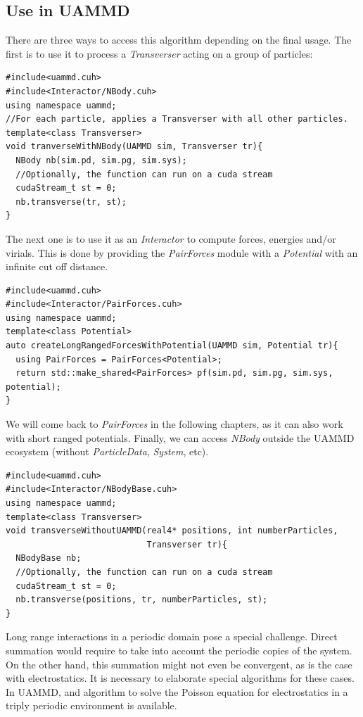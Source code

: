 \documentclass[ twoside,openright,titlepage,numbers=noenddot,%
headinclude,footinclude,cleardoublepage=empty,abstract=on,
BCOR=5mm,paper=a4,fontsize=11pt, dvipsnames
]{scrreprt}
\def\ucpp{uammd_cpp_lexer.py:UAMMDCppLexer -x}
\newcommand{\uammd}{\gls{UAMMD}\xspace}
\begin{document}
\subsection*{Use in UAMMD}
There are three ways to access this algorithm depending on the final usage.
The first is to use it to process a \emph{Transverser} acting on a group of particles:
\begin{verbatim}
#include<uammd.cuh>
#include<Interactor/NBody.cuh>
using namespace uammd;
//For each particle, applies a Transverser with all other particles.
template<class Transverser>
void tranverseWithNBody(UAMMD sim, Transverser tr){
  NBody nb(sim.pd, sim.pg, sim.sys);
  //Optionally, the function can run on a cuda stream
  cudaStream_t st = 0;
  nb.transverse(tr, st);
}
\end{verbatim}
The next one is to use it as an \emph{Interactor} to compute forces, energies and/or virials. This is done by providing the \emph{PairForces} module with a \emph{Potential} with an infinite cut off distance.
\begin{verbatim}
#include<uammd.cuh>
#include<Interactor/PairForces.cuh>
using namespace uammd;
template<class Potential>
auto createLongRangedForcesWithPotential(UAMMD sim, Potential tr){
  using PairForces = PairForces<Potential>;
  return std::make_shared<PairForces> pf(sim.pd, sim.pg, sim.sys, potential);
}
\end{verbatim}
We will come back to \emph{PairForces} in the following chapters, as it can also work with short ranged potentials.
Finally, we can access \emph{NBody} outside the \uammd ecosystem (without \emph{ParticleData}, \emph{System}, etc).
\begin{verbatim}
#include<uammd.cuh>
#include<Interactor/NBodyBase.cuh>
using namespace uammd;
template<class Transverser>
void transverseWithoutUAMMD(real4* positions, int numberParticles,
                            Transverser tr){
  NBodyBase nb;
  //Optionally, the function can run on a cuda stream
  cudaStream_t st = 0;
  nb.transverse(positions, tr, numberParticles, st);
}
\end{verbatim}


Long range interactions in a periodic domain pose a special challenge. Direct summation would require to take into account the periodic copies of the system. On the other hand, this summation might not even be convergent, as is the case with electrostatics. It is necessary to elaborate special algorithms for these cases. In \uammd, and algorithm to solve the Poisson equation for electrostatics in a triply periodic environment is available.
\end{document}
